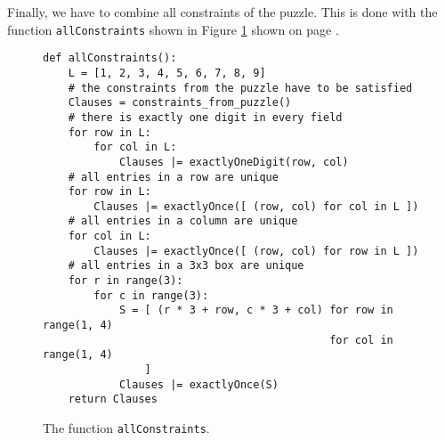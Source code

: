 Finally, we have to combine all constraints of the puzzle.  This is done with the function
\texttt{allConstraints} shown in Figure \ref{fig:sudoku-allConstraints} shown on page \pageref{fig:sudoku-allConstraints}.

\begin{figure}[!ht]
\centering
\begin{verbatim}
def allConstraints(): 
    L = [1, 2, 3, 4, 5, 6, 7, 8, 9]
    # the constraints from the puzzle have to be satisfied
    Clauses = constraints_from_puzzle()
    # there is exactly one digit in every field
    for row in L:
        for col in L:
            Clauses |= exactlyOneDigit(row, col) 
    # all entries in a row are unique
    for row in L:
        Clauses |= exactlyOnce([ (row, col) for col in L ]) 
    # all entries in a column are unique
    for col in L:
        Clauses |= exactlyOnce([ (row, col) for row in L ])
    # all entries in a 3x3 box are unique    
    for r in range(3):
        for c in range(3):
            S = [ (r * 3 + row, c * 3 + col) for row in range(1, 4)
                                             for col in range(1, 4) 
                ]
            Clauses |= exactlyOnce(S)
    return Clauses
 \end{verbatim}
\vspace*{-0.3cm}
\caption{The function \texttt{allConstraints}.}
\label{fig:sudoku-allConstraints}
\end{figure}

\pagebreak

\hspace*{\fill}
\pagebreak

